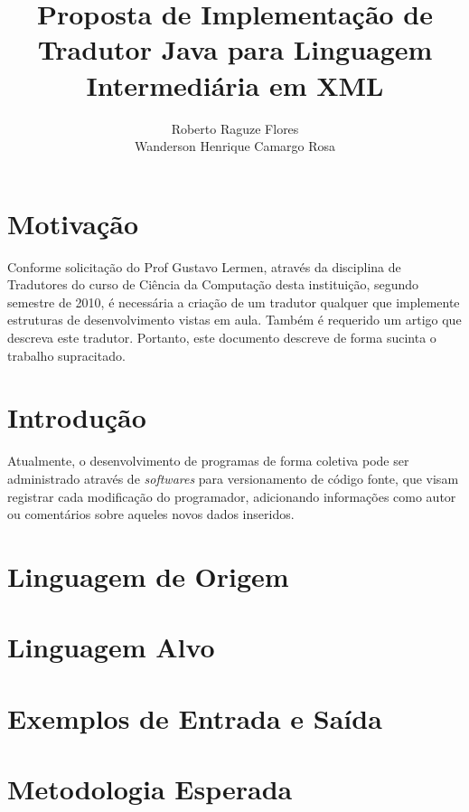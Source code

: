 \documentclass{article}
\title{Proposta de Implementação de Tradutor Java para Linguagem Intermediária
em XML}
\author{Roberto Raguze Flores\inst{1}\\Wanderson Henrique Camargo Rosa\inst{1}}
\begin{document}
\maketitle{}

\section{Motivação}

Conforme solicitação do Prof Gustavo Lermen, através da disciplina de Tradutores
do curso de Ciência da Computação desta instituição, segundo semestre de 2010,
é necessária a criação de um tradutor qualquer que implemente estruturas de 
desenvolvimento vistas em aula. Também é requerido um artigo que descreva este
tradutor. Portanto, este documento descreve de forma sucinta o trabalho
supracitado.

\section{Introdução}

Atualmente, o desenvolvimento de programas de forma coletiva pode ser
administrado através de \emph{softwares} para versionamento de código fonte, que
visam registrar cada modificação do programador, adicionando informações como
autor ou comentários sobre aqueles novos dados inseridos.

\section{Linguagem de Origem}

\section{Linguagem Alvo}

\section{Exemplos de Entrada e Saída}

\section{Metodologia Esperada}
\end{document}
